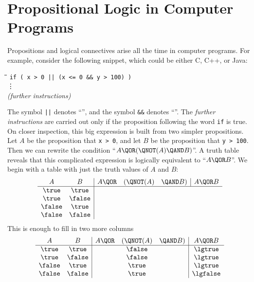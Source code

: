 \begin{problems}

\classproblems
{}

\homeworkproblems
{}
\end{problems}

\section{Propositional Logic in Computer Programs}

Propositions and logical connectives arise all the time in computer
programs.  For example, consider the following snippet, which could be
either C, C++, or Java:
%
\begin{tabbing}
\hspace{1in} \= \quad\quad \= \quad\quad \= \quad\quad \= \kill
\> \texttt{if ( x > 0 || (x <= 0 \&\& y > 100) )} \\
\> \> \vdots\\
\> \emph{(further instructions)}
\end{tabbing}
%
The symbol \texttt{||} denotes ``\QOR'', and the symbol \texttt{\&\&}
denotes ``\QAND''.  The \emph{further instructions} are carried out
only if the proposition following the word \texttt{if} is true.  On
closer inspection, this big expression is built from two simpler
propositions.  Let $A$ be the proposition that \texttt{x > 0}, and let
$B$ be the proposition that \texttt{y > 100}.  Then we can rewrite the
condition ``$A \QOR (\QNOT(A) \QAND B)$''.
%
A truth table reveals that this complicated expression is logically
equivalent to ``$A \QOR B$''.  We begin with a table with just the truth
values of $A$ and $B$:
\[
\begin{array}{cc|ccc|c}
A      & B      & A \QOR  & (\QNOT(A)& \QAND  B) & A \QOR  B \\ \hline
\true  & \true \\
\true  & \false\\
\false & \true \\
\false & \false
\end{array}
\]
This is enough to fill in two more columns
\[
\begin{array}{cc|ccc|c}
A      & B      & A \QOR  &(\QNOT   (A)& \QAND  B) & A \QOR  B \\ \hline
\true  & \true  &          & \false &              & \lgtrue \\
\true  & \false &          & \false &              & \lgtrue \\
\false & \true  &          & \true  &              & \lgtrue \\
\false & \false &          & \true  &              & \lgfalse\\
\end{array}
\]
